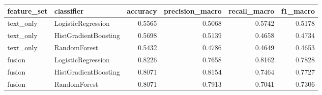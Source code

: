 \begin{tabular}{llrrrr}
\toprule
feature\_set & classifier & accuracy & precision\_macro & recall\_macro & f1\_macro \\
\midrule
text\_only & LogisticRegression & 0.5565 & 0.5068 & 0.5742 & 0.5178 \\
text\_only & HistGradientBoosting & 0.5698 & 0.5139 & 0.4658 & 0.4734 \\
text\_only & RandomForest & 0.5432 & 0.4786 & 0.4649 & 0.4653 \\
fusion & LogisticRegression & 0.8226 & 0.7658 & 0.8162 & 0.7828 \\
fusion & HistGradientBoosting & 0.8071 & 0.8154 & 0.7464 & 0.7727 \\
fusion & RandomForest & 0.8071 & 0.7913 & 0.7041 & 0.7306 \\
\bottomrule
\end{tabular}

